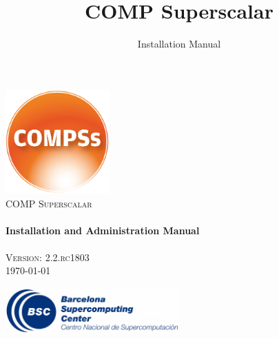 \documentclass[a4paper,12pt]{article}
\title{COMP Superscalar}
\author{Installation Manual}
\def \compssversion {2.2.rc1803}
\begin{document}
  \hypersetup{pageanchor=false}
  \begin{titlepage} 
    \begin{center} 
      \includegraphics[width=0.3\textwidth]{./Figures/Logos/degradado-naranja-compss.jpg}~\\[1cm] 
      \textsc{\LARGE COMP Superscalar}\\[1.5cm] 
      
      \HRule \\[0.4cm] 
      { \huge \bfseries Installation and Administration Manual \\[0.4cm] }
      \HRule \\[1.5cm] 

      { \large \textsc{Version: \compssversion}} \\[0.3cm]
      { \large \today } 
      
      \vfill 
      \includegraphics[width=0.5\textwidth]{./Figures/bsc_280.jpg}~\\[1cm]
    \end{center} 
  \end{titlepage}
  \hypersetup{pageanchor=true}
  
\end{document}
